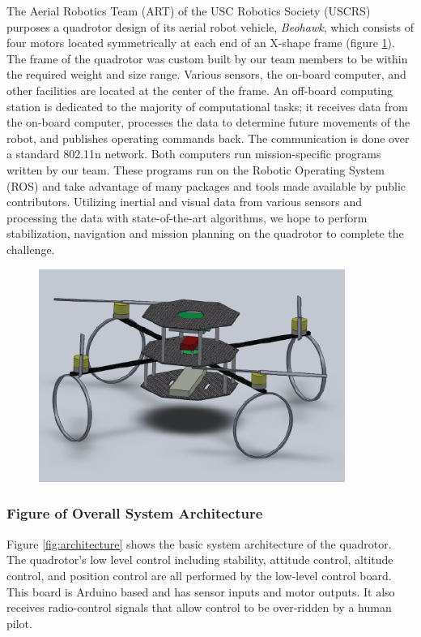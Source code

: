 \documentclass[12pt, letterpaper]{article}
\begin{document}
The Aerial Robotics Team (ART) of the USC Robotics Society (USCRS) purposes a quadrotor design of its aerial robot vehicle, \textit{Beohawk}, which consists of four motors located symmetrically at each end of an X-shape frame (figure \ref{fig:beohawk}). The frame of the quadrotor was custom built by our team members to be within the required weight and size range. Various sensors, the on-board computer, and other facilities are located at the center of the frame. An off-board computing station is dedicated to the majority of computational tasks; it receives data from the on-board computer, processes the data to determine future movements of the robot, and publishes operating commands back. The communication is done over a standard 802.11n network. Both computers run mission-specific programs written by our team. These programs run on the Robotic Operating System (ROS) and take advantage of many packages and tools made available by public contributors. Utilizing inertial and visual data from various sensors and processing the data with state-of-the-art algorithms, we hope to perform stabilization, navigation and mission planning on the quadrotor to complete the challenge.

\begin{figure}[h]
\centering
\includegraphics[width=10cm]{images/Beohawk_V3.png}
\label{fig:beohawk}
\end{figure}

\subsubsection{Figure of Overall System Architecture}

Figure \eqref{fig:architecture} shows the basic system architecture of the quadrotor. The quadrotor's low level control including stability, attitude control, altitude control, and position control are all performed by the low-level control board. This board is Arduino based and has sensor inputs and motor outputs. It also receives radio-control signals that allow control to be over-ridden by a human pilot.
\end{document}
